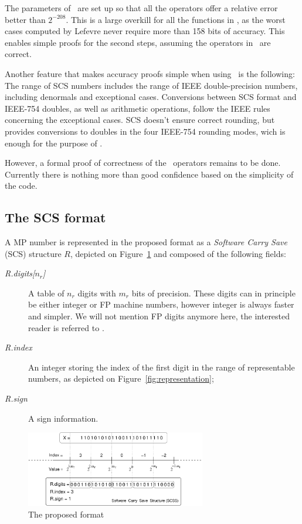 The parameters of \scslib\ are set up so that all the operators offer
a relative error better than $2^{-208}$.  This is a large overkill for
all the functions in \crlibm, as the worst cases computed by Lefevre
never require more than 158 bits of accuracy. This enables simple
proofs for the second steps, assuming the operators in \scslib\ are
correct.

Another feature that makes accuracy proofs simple when using \scslib\ 
is the following: The range of SCS numbers includes the range of IEEE
double-precision numbers, including denormals and exceptional cases.
Conversions between SCS format and IEEE-754 doubles, as well as
arithmetic operations, follow the IEEE rules concerning the
exceptional cases. SCS doesn't ensure correct rounding, but provides
conversions to doubles in the four IEEE-754 rounding modes, wich is
enough for the purpose of \crlibm.

However, a formal proof of correctness of the \scslib\ operators
remains to be done. Currently there is nothing more than good
confidence based on the simplicity of the code.


\subsection{The SCS format}

 A MP number is represented in the proposed format as a
\emph{Software Carry Save} (SCS) structure $R$, depicted on
Figure~\ref{fig:scsrepresentation} and composed of the following
fields:
\begin{description}
\item[\emph{R.digits[$n_r$]}] A table of $n_r$ digits with $m_r$ bits
  of precision. These digits can in principle be either integer or FP
  machine numbers, however integer is always faster and simpler. We
  will not mention FP digits anymore here, the interested reader is
  referred to \cite{DefDin2002,DinDef2003}.
\item[\emph{R.index}] An integer storing the index of the first digit
  in the range of representable numbers, as depicted on
  Figure~\ref{fig:representation};
 \item[\emph{R.sign}] A sign information.  
\end{description}

\begin{figure}[h]
\begin{center}
\includegraphics[width=0.7\textwidth]{fig_scs/exponent_representation} %
\caption{The proposed format \label{fig:scsrepresentation}}
\end{center}
\end{figure}
  
